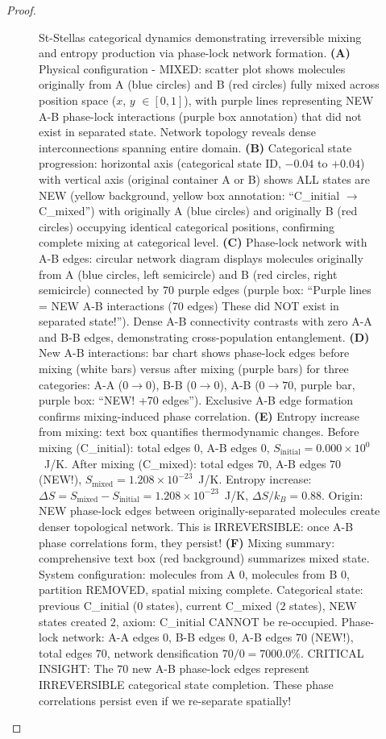 \begin{proof}
\begin{figure}[htbp]
    \caption{St-Stellas categorical dynamics demonstrating irreversible mixing and entropy production via phase-lock network formation. \textbf{(A)} Physical configuration - MIXED: scatter plot shows molecules originally from A (blue circles) and B (red circles) fully mixed across position space ($x$, $y$ $\in [0, 1]$), with purple lines representing NEW A-B phase-lock interactions (purple box annotation) that did not exist in separated state. Network topology reveals dense interconnections spanning entire domain. \textbf{(B)} Categorical state progression: horizontal axis (categorical state ID, $-0.04$ to $+0.04$) with vertical axis (original container A or B) shows ALL states are NEW (yellow background, yellow box annotation: ``C\_initial $\to$ C\_mixed'') with originally A (blue circles) and originally B (red circles) occupying identical categorical positions, confirming complete mixing at categorical level. \textbf{(C)} Phase-lock network with A-B edges: circular network diagram displays molecules originally from A (blue circles, left semicircle) and B (red circles, right semicircle) connected by $70$ purple edges (purple box: ``Purple lines = NEW A-B interactions (70 edges) These did NOT exist in separated state!''). Dense A-B connectivity contrasts with zero A-A and B-B edges, demonstrating cross-population entanglement. \textbf{(D)} New A-B interactions: bar chart shows phase-lock edges before mixing (white bars) versus after mixing (purple bars) for three categories: A-A ($0 \to 0$), B-B ($0 \to 0$), A-B ($0 \to 70$, purple bar, purple box: ``NEW! +70 edges''). Exclusive A-B edge formation confirms mixing-induced phase correlation. \textbf{(E)} Entropy increase from mixing: text box quantifies thermodynamic changes. Before mixing (C\_initial): total edges $0$, A-B edges $0$, $S_{\text{initial}} = 0.000 \times 10^0$~J/K. After mixing (C\_mixed): total edges $70$, A-B edges $70$ (NEW!), $S_{\text{mixed}} = 1.208 \times 10^{-23}$~J/K. Entropy increase: $\Delta S = S_{\text{mixed}} - S_{\text{initial}} = 1.208 \times 10^{-23}$~J/K, $\Delta S / k_B = 0.88$. Origin: NEW phase-lock edges between originally-separated molecules create denser topological network. This is IRREVERSIBLE: once A-B phase correlations form, they persist! \textbf{(F)} Mixing summary: comprehensive text box (red background) summarizes mixed state. System configuration: molecules from A $0$, molecules from B $0$, partition REMOVED, spatial mixing complete. Categorical state: previous C\_initial ($0$ states), current C\_mixed ($2$ states), NEW states created $2$, axiom: C\_initial CANNOT be re-occupied. Phase-lock network: A-A edges $0$, B-B edges $0$, A-B edges $70$ (NEW!), total edges $70$, network densification $70/0 = 7000.0\%$. CRITICAL INSIGHT: The $70$ new A-B phase-lock edges represent IRREVERSIBLE categorical state completion. These phase correlations persist even if we re-separate spatially!}
    \label{fig:categorical_dynamics}
    \end{figure}


\end{proof}

